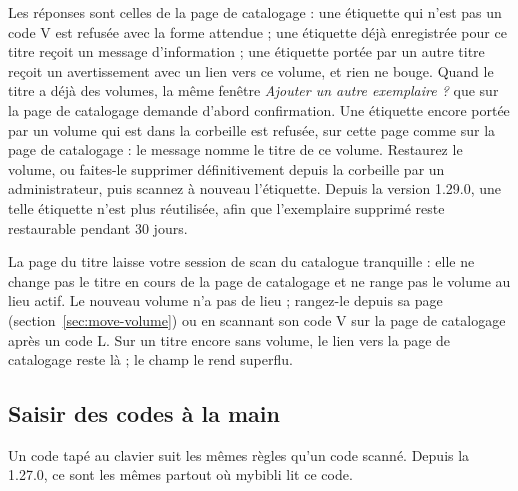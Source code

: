 Les réponses sont celles de la page de catalogage : une étiquette qui
n'est pas un code V est refusée avec la forme attendue ; une étiquette
déjà enregistrée pour ce titre reçoit un message d'information ; une
étiquette portée par un autre titre reçoit un avertissement avec un
lien vers ce volume, et rien ne bouge. Quand le titre a déjà des
volumes, la même fenêtre \emph{Ajouter un autre exemplaire ?} que sur
la page de catalogage demande d'abord confirmation. Une étiquette
encore portée par un volume qui est dans la corbeille est refusée, sur
cette page comme sur la page de catalogage : le message nomme le titre
de ce volume. Restaurez le volume, ou faites-le supprimer
définitivement depuis la corbeille par un administrateur, puis scannez
à nouveau l'étiquette. Depuis la version 1.29.0, une telle étiquette
n'est plus réutilisée, afin que l'exemplaire supprimé reste restaurable
pendant 30 jours.

La page du titre laisse votre session de scan du catalogue tranquille :
elle ne change pas le titre en cours de la page de catalogage et ne
range pas le volume au lieu actif. Le nouveau volume n'a pas de lieu ;
rangez-le depuis sa page (section~\ref{sec:move-volume}) ou en scannant
son code V sur la page de catalogage après un code L. Sur un titre
encore sans volume, le lien vers la page de catalogage reste là ; le
champ le rend superflu.

\subsection*{Saisir des codes à la main}
\label{sec:typed-codes}

Un code tapé au clavier suit les mêmes règles qu'un code scanné.
Depuis la 1.27.0, ce sont les mêmes partout où mybibli lit ce code.


